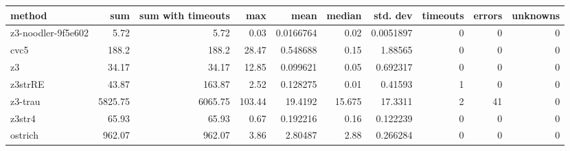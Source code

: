 \begin{tabular}{lrrrrrrrrr}
\hline
 method             &     sum &   sum with timeouts &    max &       mean &   median &   std. dev &   timeouts &   errors &   unknowns \\
\hline
 z3-noodler-9f5e602 &    5.72 &                5.72 &   0.03 &  0.0166764 &    0.02  &  0.0051897 &          0 &        0 &          0 \\
 cvc5               &  188.2  &              188.2  &  28.47 &  0.548688  &    0.15  &  1.88565   &          0 &        0 &          0 \\
 z3                 &   34.17 &               34.17 &  12.85 &  0.099621  &    0.05  &  0.692317  &          0 &        0 &          0 \\
 z3strRE            &   43.87 &              163.87 &   2.52 &  0.128275  &    0.01  &  0.41593   &          1 &        0 &          0 \\
 z3-trau            & 5825.75 &             6065.75 & 103.44 & 19.4192    &   15.675 & 17.3311    &          2 &       41 &          0 \\
 z3str4             &   65.93 &               65.93 &   0.67 &  0.192216  &    0.16  &  0.122239  &          0 &        0 &          0 \\
 ostrich            &  962.07 &              962.07 &   3.86 &  2.80487   &    2.88  &  0.266284  &          0 &        0 &          0 \\
\hline
\end{tabular}
